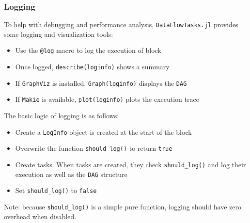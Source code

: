 \documentclass{beamer}
\newcommand{\DFT}{\texttt{DataFlowTasks.jl}}
\begin{document}
\begin{frame}
\frametitle{Logging}

To help with debugging and performance analysis, \DFT{} provides some logging
and visualization tools:
\begin{itemize}
  \item Use the \texttt{@log} macro to log the execution of block
  \item Once logged, \texttt{describe(loginfo)} shows a summary
  \item If \texttt{GraphViz} is installed,
  \texttt{Graph(loginfo)} displays the \texttt{DAG}
  \item If \texttt{Makie} is available,
  \texttt{plot(loginfo)} plots the execution trace
\end{itemize}

The basic logic of logging is as follows:
\begin{itemize}
  \item Create a \texttt{LogInfo} object is created at the start of the block  
  \item Overwrite the function
  \texttt{should_log()} to return \texttt{true}
  \item Create tasks. When tasks are created, they check
  \texttt{should_log()} and log their execution as well as the
  \texttt{DAG} structure
  \item Set \texttt{should_log()} to \texttt{false}
\end{itemize}

\begin{alertblock}{}
  Note: because \texttt{should_log()} is a simple pure function,
  logging should have zero overhead when disabled.
\end{alertblock}

\end{frame}
\end{document}

